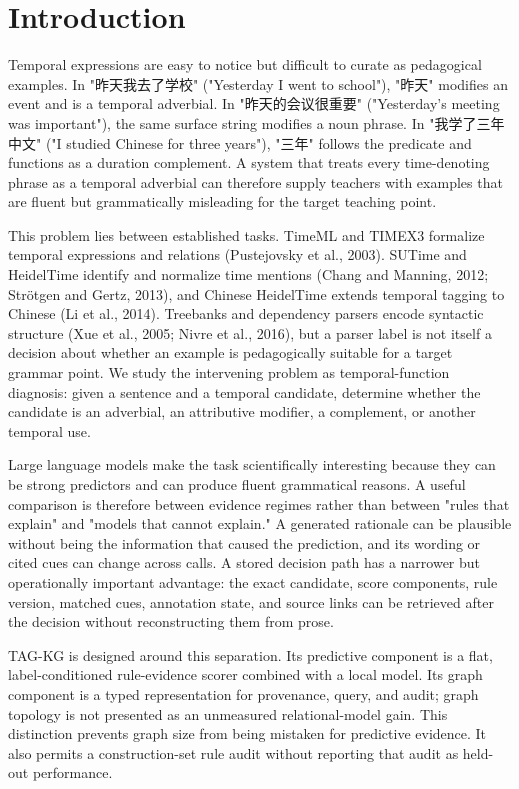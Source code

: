 \documentclass{CUP-JNL-NLP}
\begin{document}
\section{Introduction}
Temporal expressions are easy to notice but difficult to curate as pedagogical examples. In "昨天我去了学校" ("Yesterday I went to school"), "昨天" modifies an event and is a temporal adverbial. In "昨天的会议很重要" ("Yesterday's meeting was important"), the same surface string modifies a noun phrase. In "我学了三年中文" ("I studied Chinese for three years"), "三年" follows the predicate and functions as a duration complement. A system that treats every time-denoting phrase as a temporal adverbial can therefore supply teachers with examples that are fluent but grammatically misleading for the target teaching point.

This problem lies between established tasks. TimeML and TIMEX3 formalize temporal expressions and relations (Pustejovsky et al., 2003). SUTime and HeidelTime identify and normalize time mentions (Chang and Manning, 2012; Strötgen and Gertz, 2013), and Chinese HeidelTime extends temporal tagging to Chinese (Li et al., 2014). Treebanks and dependency parsers encode syntactic structure (Xue et al., 2005; Nivre et al., 2016), but a parser label is not itself a decision about whether an example is pedagogically suitable for a target grammar point. We study the intervening problem as temporal-function diagnosis: given a sentence and a temporal candidate, determine whether the candidate is an adverbial, an attributive modifier, a complement, or another temporal use.

Large language models make the task scientifically interesting because they can be strong predictors and can produce fluent grammatical reasons. A useful comparison is therefore between evidence regimes rather than between "rules that explain" and "models that cannot explain." A generated rationale can be plausible without being the information that caused the prediction, and its wording or cited cues can change across calls. A stored decision path has a narrower but operationally important advantage: the exact candidate, score components, rule version, matched cues, annotation state, and source links can be retrieved after the decision without reconstructing them from prose.

TAG-KG is designed around this separation. Its predictive component is a flat, label-conditioned rule-evidence scorer combined with a local model. Its graph component is a typed representation for provenance, query, and audit; graph topology is not presented as an unmeasured relational-model gain. This distinction prevents graph size from being mistaken for predictive evidence. It also permits a construction-set rule audit without reporting that audit as held-out performance.
\end{document}
